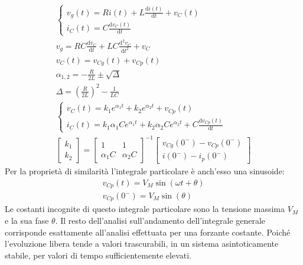 \documentclass{article}
\newcommand{\df}{\mathrm{d}}
\numberwithin{equation}{subsection}
\begin{document}
\begin{gather*}
    \begin{cases}
        v_g(t)=Ri(t)+\displaystyle L\frac{\df i(t)}{\df t}+v_C(t)\\
        i_C(t)=\displaystyle C\frac{\df v_C(t)}{\df t}
    \end{cases}\\
    v_g=RC\displaystyle\frac{\df v_C}{\df t}+LC\frac{\df^2v_C}{\df t^2}+v_C\\
    v_C(t)=v_{Cg}(t)+v_{Cp}(t)\\
    \alpha_{1,2}=\displaystyle-\frac{R}{2L}\pm\sqrt{\Delta}\\
    \Delta=\left(\displaystyle\frac{R}{2L}\right)^2-\frac{1}{LC}\\
    \begin{cases}
        v_C(t)=k_1e^{\alpha_1t}+k_2e^{\alpha_2t}+v_{Cp}(t)\\
        i_C(t)=k_1\alpha_1Ce^{\alpha_1t}+k_2\alpha_2Ce^{\alpha_2t}+C\displaystyle\frac{\df v_{Cp}(t)}{\df t}
    \end{cases}\\
    \begin{bmatrix}
        k_1\\k_2
    \end{bmatrix}=\begin{bmatrix}
        1&1\\\alpha_1C&\alpha_2C
    \end{bmatrix}^{-1}\begin{bmatrix}
        v_{Cg}(0^-)-v_{Cp}(0^-)\\i(0^-)-i_p(0^-)
    \end{bmatrix}
\end{gather*}
Per la proprietà di similarità l'integrale particolare è anch'esso una sinusoide:
\begin{gather*}
    v_{Cp}(t)=V_M\sin(\omega t+\theta)\\
    v_{Cp}(0^-)=V_M\sin(\theta)
\end{gather*}
Le costanti incognite di questo integrale particolare sono la tensione massima $V_M$ e la sua fase $\theta$. Il resto dell'analisi sull'andamento dell'integrale generale 
corrisponde esattamente all'analisi effettuata per una forzante costante. Poiché l'evoluzione libera tende a valori trascurabili, in un sistema asintoticamente stabile, per 
valori di tempo sufficientemente elevati. 
\end{document}
